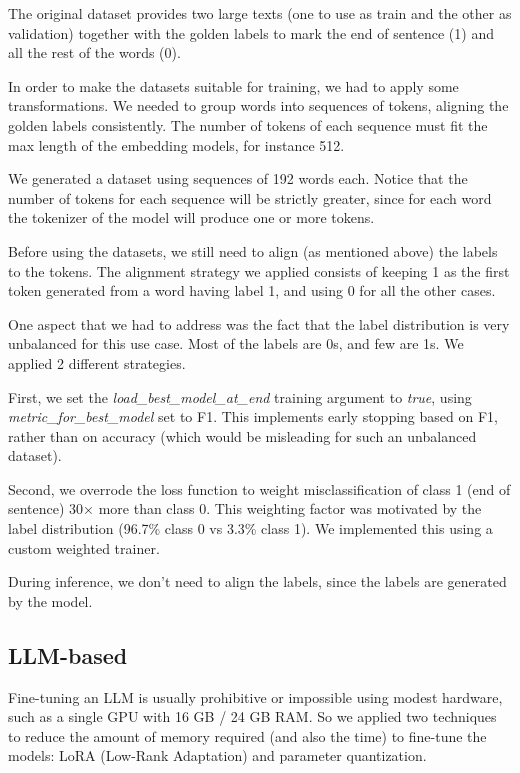 \documentclass[11pt]{article}
\begin{document}
The original dataset provides two large texts (one to use as train and the other as validation) together with the golden labels to mark the end of sentence (1) and all the rest of the words (0).

In order to make the datasets suitable for training, we had to apply some transformations. 
We needed to group words into sequences of tokens, aligning the golden labels consistently.
The number of tokens of each sequence must fit the max length of the embedding models,
for instance 512.

We generated a dataset using sequences of 192 words each. Notice that the number of tokens for each sequence will be strictly greater,
since for each word the tokenizer of the model will produce one or more tokens.

Before using the datasets, we still need to align (as mentioned above) the labels to the tokens.
The alignment strategy we applied consists of keeping 1 as the first token generated from a word
having label 1, and using 0 for all the other cases.

One aspect that we had to address was the fact that the label distribution is very unbalanced
for this use case. Most of the labels are 0s, and few are 1s. We applied 2 different strategies.

First, we set the \emph{load\_best\_model\_at\_end} training argument to \emph{true},
using \emph{metric\_for\_best\_model} set to F1. This implements early stopping based on F1,
rather than on accuracy (which would be misleading for such an unbalanced dataset).

Second, we overrode the loss function to weight misclassification of class 1 (end of sentence) 30× more than class 0. 
This weighting factor was motivated by the label distribution (96.7\% class 0 vs 3.3\% class 1). 
We implemented this using a custom weighted trainer. 

During inference, we don't need to align the labels, since the labels are generated by the model.

\subsection{LLM-based}

Fine-tuning an LLM is usually prohibitive or impossible using modest hardware, such as a single GPU with 16 GB / 24 GB RAM. So we applied two techniques to reduce the amount of memory required (and also the time) to fine-tune the models: LoRA (Low-Rank Adaptation) and parameter quantization.
\end{document}
